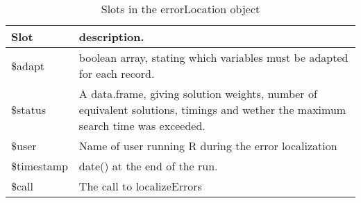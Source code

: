 \begin{table}
\caption{Slots in the {\sf errorLocation} object}
\label{tblErrorLocalization}
\begin{tabular}{lp{}}
\hline
Slot          & description. \\
\hline
{\sf \$adapt} & boolean array, stating which variables must be adapted for each record.\\
{\sf \$status}& A {\sf data.frame}, giving solution weights, number of equivalent solutions, timings and wether the maximum search time was exceeded.\\
{\sf \$user}  & Name of user running R during the error localization\\
{\sf \$timestamp} & {\sf date()} at the end of the run.\\
{\sf \$call}  & The call to {\sf localizeErrors}\\
\hline
\end{tabular}
\end{table}
